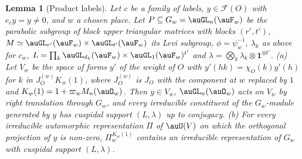 \documentclass[10pt]{amsart}
\newtheorem{lemma}[theorem]{Lemma}
\theoremstyle{definition}
\theoremstyle{remark}
\begin{document}
\begin{lemma}[Product labels]\label{prm:label}
Let $c$ be a family of labels, $y\in\mathcal F(O)$ with $e_cy=y\ne0$, and $w$ a chosen place. Let
$P\subseteq G_w=\auGL_n(\auF_w)$ be the parabolic subgroup of block upper triangular matrices with
blocks $(r',t')$, $M\simeq\auGL_{r'}(\auF_w)\times\auGL_{t'}(\auF_w)$ its Levi subgroup, $\phi=
\psi_w^{-1}$, $\lambda_k$ as above for $c_w$, $L=\prod_k\auGL_{d_k}(\auF_w)\times\auGL_1(\auF_w)^{t'}$ and
$\lambda=\bigotimes_k\lambda_k\otimes\mathbf 1^{\otimes t'}$.
{\rm(a)} Let $V_w$ be the space of forms $y'$ of the weight of $O$ with $y'(hk)=\chi_O(k)y'(h)$ for $k$
in $J_O^{(w)}K_w(1)$, where $J_O^{(w)}$ is $J_O$ with the component at $w$ replaced by $1$ and $K_w(1)=
1+\varpi_wM_n(\auO_w)$. Then $y\in V_w$, $\auGL_n(\auO_w)$ acts on $V_w$ by right translation through
$G_w$, and every irreducible constituent of the $G_w$-module generated by $y$ has cuspidal support
$(L,\lambda)$ up to conjugacy.
{\rm(b)} For every irreducible automorphic representation $\Pi$ of $\auU(V)$ on which the orthogonal
projection of $y$ is non-zero, $\Pi_w^{K_w(1)}$ contains an irreducible representation of $G_w$ with
cuspidal support $(L,\lambda)$.
\end{lemma}
\end{document}
